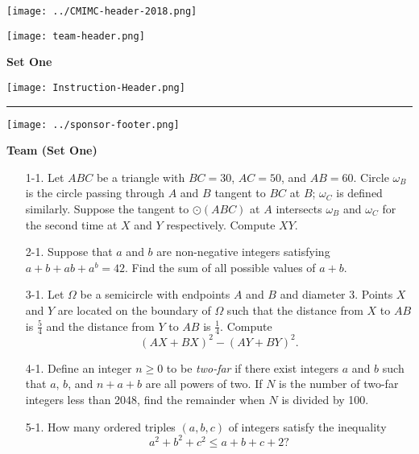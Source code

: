 \documentclass[10pt]{article}
\begin{document}
\thispagestyle{empty}
\begin{center}

\vspace*{40pt}

\texttt{[image: ../CMIMC-header-2018.png]}

\texttt{[image: team-header.png]}

\vspace{0.2in}

\Huge\textbf{Set One}\normalsize

\vspace{1in}

\texttt{[image: Instruction-Header.png]}

\noindent\rule{15.7cm}{2pt}
\end{center}

\vspace{10pt}



\vspace{0.7in}

\begin{center}
\texttt{[image: ../sponsor-footer.png]}
\end{center}
\newpage

\begin{center}
\huge\textbf{Team (Set One)}\normalsize

\vspace{3pt}
\end{center}

\begin{enumerate}

\item[1-1.] Let $ABC$ be a triangle with $BC=30$, $AC=50$, and $AB=60$.  Circle $\omega_B$ is the circle passing through $A$ and $B$ tangent to $BC$ at $B$; $\omega_C$ is defined similarly.  Suppose the tangent to $\odot(ABC)$ at $A$ intersects $\omega_B$ and $\omega_C$ for the second time at $X$ and $Y$ respectively.  Compute $XY$.

\item[2-1.] Suppose that $a$ and $b$ are non-negative integers satisfying $a + b + ab + a^b = 42$. Find the sum of all possible values of $a + b$.

\item[3-1.] Let $\Omega$ be a semicircle with endpoints $A$ and $B$ and diameter 3. Points $X$ and $Y$ are located on the boundary of $\Omega$ such that the distance from $X$ to $AB$ is $\frac{5}{4}$ and the distance from $Y$ to $AB$ is $\frac{1}{4}$. Compute \[(AX+BX)^2 - (AY+BY)^2.\]

\item[4-1.] Define an integer $n \ge 0$ to be \textit{two-far} if there exist integers $a$ and $b$ such that $a$, $b$, and $n + a + b$ are all powers of two. If $N$ is the number of two-far integers less than 2048, find the remainder when $N$ is divided by 100.

\item[5-1.] How many ordered triples $(a,b,c)$ of integers satisfy the inequality \[a^2+b^2+c^2 \leq a+b+c+2?\]

\end{enumerate}
\end{document}
